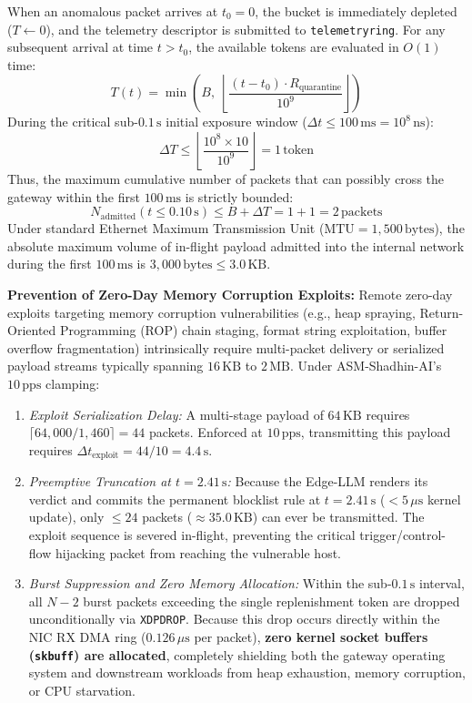 \documentclass[journal]{IEEEtran}
\renewcommand{\_}{\textunderscore\allowbreak}
\begin{document}
When an anomalous packet arrives at $t_0 = 0$, the bucket is immediately depleted ($T \leftarrow 0$), and the telemetry descriptor is submitted to \texttt{telemetry\_ring}. For any subsequent arrival at time $t > t_0$, the available tokens are evaluated in $O(1)$ time:
\begin{equation}
  T(t) = \min\left(B,\; \left\lfloor \frac{(t - t_0) \cdot R_{\text{quarantine}}}{10^9} \right\rfloor \right)
  \label{eq:token_bucket}
\end{equation}
During the critical sub-$0.1\,\text{s}$ initial exposure window ($\Delta t \le 100\,\text{ms} = 10^8\,\text{ns}$):
\begin{equation}
  \Delta T \le \left\lfloor \frac{10^8 \times 10}{10^9} \right\rfloor = 1\,\text{token}
\end{equation}
Thus, the maximum cumulative number of packets that can possibly cross the gateway within the first $100\,\text{ms}$ is strictly bounded:
\begin{equation}
  N_{\text{admitted}}(t \le 0.10\,\text{s}) \le B + \Delta T = 1 + 1 = 2\,\text{packets}
\end{equation}
Under standard Ethernet Maximum Transmission Unit ($\text{MTU} = 1{,}500\,\text{bytes}$), the absolute maximum volume of in-flight payload admitted into the internal network during the first $100\,\text{ms}$ is $3{,}000\,\text{bytes} \le 3.0\,\text{KB}$.

\textbf{Prevention of Zero-Day Memory Corruption Exploits:}
Remote zero-day exploits targeting memory corruption vulnerabilities (e.g., heap spraying, Return-Oriented Programming (ROP) chain staging, format string exploitation, buffer overflow fragmentation) intrinsically require multi-packet delivery or serialized payload streams typically spanning $16\,\text{KB}$ to $2\,\text{MB}$. Under ASM-Shadhin-AI's $10\,\text{pps}$ clamping:
\begin{enumerate}
  \item \textit{Exploit Serialization Delay:} A multi-stage payload of $64\,\text{KB}$ requires $\lceil 64{,}000 / 1{,}460 \rceil = 44$ packets. Enforced at $10\,\text{pps}$, transmitting this payload requires $\Delta t_{\text{exploit}} = 44 / 10 = 4.4\,\text{s}$.
  \item \textit{Preemptive Truncation at $t = 2.41\,\text{s}$:} Because the Edge-LLM renders its verdict and commits the permanent blocklist rule at $t = 2.41\,\text{s}$ ($< 5\,\mu\text{s}$ kernel update), only $\le 24$ packets ($\approx 35.0\,\text{KB}$) can ever be transmitted. The exploit sequence is severed in-flight, preventing the critical trigger/control-flow hijacking packet from reaching the vulnerable host.
  \item \textit{Burst Suppression and Zero Memory Allocation:} Within the sub-$0.1\,\text{s}$ interval, all $N - 2$ burst packets exceeding the single replenishment token are dropped unconditionally via \texttt{XDP\_DROP}. Because this drop occurs directly within the NIC RX DMA ring ($0.126\,\mu\text{s}$ per packet), \textbf{zero kernel socket buffers (\texttt{sk\_buff}) are allocated}, completely shielding both the gateway operating system and downstream workloads from heap exhaustion, memory corruption, or CPU starvation.
\end{enumerate}
\end{document}
